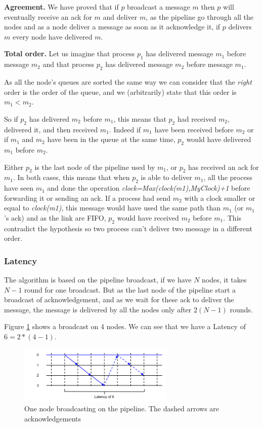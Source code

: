 \documentclass[a4paper]{article}
\begin{document}
\bigskip
\noindent\textbf{Agreement.} We have proved that if $p$ broadcast a message
$m$ then $p$ will eventually receive an ack for $m$ and deliver $m$, as the
pipeline go through all the nodes and as a node deliver a message as soon as
it acknowledge it, if $p$ delivers $m$ every node have delivered $m$.

\bigskip
\noindent\textbf{Total order.} Let us imagine that process $p_1$ has delivered
message $m_1$ before message $m_2$ and that process $p_2$ has delivered
message $m_2$ before message $m_1$.

As all the node's queues are sorted the same way we can consider that the
\textit{right} order is the order of the queue, and we (arbitrarily) state
that this order is $m_1 < m_2$.

So if $p_2$ has delivered $m_2$ before $m_1$, this means that $p_2$ had
received $m_2$, delivered it, and then received $m_1$. Indeed if $m_1$ have
been received before $m_2$ or if $m_1$ and $m_2$ have been in the queue at the
same time, $p_2$ would have delivered $m_1$ before $m_2$.

Either $p_2$ is the last node of the pipeline used by $m_1$, or $p_2$ has
received an ack for $m_1$. In both cases, this means that when $p_2$ is able
to deliver $m_1$, all the process have seen $m_1$ and done the operation 
\textit{clock=Max(clock(m1),MyClock)+1} before forwarding it or sending an
ack. If a process had send $m_2$ with a clock smaller or equal to
\textit{clock(m1)}, this message would have used the same path than $m_1$
(or $m_1$'s ack) and as the link are FIFO, $p_2$ would have received $m_2$
before $m_1$. This contradict the hypothesis so two process can't deliver two
message in a different order.

\subsubsection{Latency}
The algorithm is based on the pipeline broadcast, if we have $N$ nodes, it takes
$N-1$ round for one broadcast. But as the last node of the pipeline start a
broadcast of acknowledgement, and as we wait for these ack to deliver the
message, the message is delivered by all the nodes only after $2(N-1)$ rounds.

Figure \ref{figure:latency2} shows a broadcast on 4 nodes. We can see that
we have a Latency of $6=2*(4-1)$.

\begin{figure}[h]
    \centering
    \includegraphics[width=280px]{Latency2.png}
    \caption{One node broadcasting on the pipeline. The dashed arrows are
    acknowledgements}
    \label{figure:latency2}
\end{figure}
\end{document}
